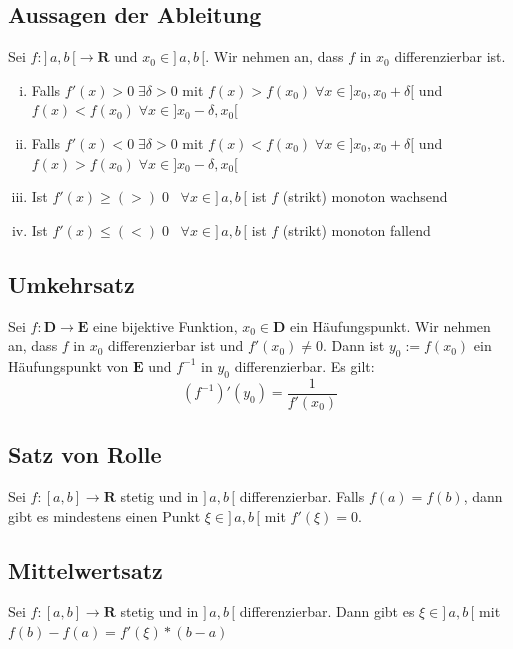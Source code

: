 \documentclass[8pt]{article}
\begin{document}
\begin{multicols*}{3}
\subsection{Aussagen der Ableitung}

Sei $f:]\,a, b\,[ \rightarrow \mathbf{R}$ und $x_0 \in ]\,a, b\,[$. Wir nehmen an, dass $f$
in $x_0$ differenzierbar ist.
\begin{enumerate}[(i)]
  \item Falls $f'(x) > 0 \; \exists \delta > 0$ mit $f(x) > f(x_0) \; \forall x \in ]x_0, x_0 + \delta[$
  und $f(x) < f(x_0) \; \forall x \in ]x_0 - \delta, x_0[$
  \item Falls $f'(x) < 0 \; \exists \delta > 0$ mit $f(x) < f(x_0) \; \forall x \in ]x_0, x_0 + \delta[$
  und $f(x) > f(x_0) \; \forall x \in ]x_0 - \delta, x_0[$
  \item Ist $f'(x) \geq (>) \; 0 \;\;\; \forall x \in ]\,a, b\,[$ ist $f$ (strikt) monoton wachsend
  \item Ist $f'(x) \leq (<) \; 0 \;\;\; \forall x \in ]\,a, b\,[$ ist $f$ (strikt) monoton fallend
\end{enumerate}

\subsection{Umkehrsatz}

Sei $f: \mathbf{D} \rightarrow \mathbf{E}$ eine bijektive Funktion,
$x_0 \in \mathbf{D}$ ein Häufungspunkt. Wir
nehmen an, dass $f$ in $x_0$ differenzierbar ist und $f'(x_0) \neq 0$.
Dann ist $y_0 := f(x_0)$ ein Häufungspunkt von $\mathbf{E}$
und $f^{-1}$ in $y_0$ differenzierbar. Es gilt:
$$
  (f^{-1})'(y_0) = \frac{1}{f'(x_0)}
$$

\subsection{Satz von Rolle}

Sei $f:[a, b] \rightarrow \mathbf{R}$ stetig und in $]\,a, b\,[$ differenzierbar. Falls
$f(a) = f(b)$, dann gibt es mindestens einen Punkt $\xi \in ]\,a, b\,[$ mit $f'(\xi) = 0$.

\subsection{Mittelwertsatz}

Sei $f:[a, b] \rightarrow \mathbf{R}$ stetig und in $]\,a, b\,[$ differenzierbar. Dann
gibt es $\xi \in ]\,a, b\,[$ mit $f(b) - f(a) = f'(\xi) * (b-a)$


\end{multicols*}
\end{document}
